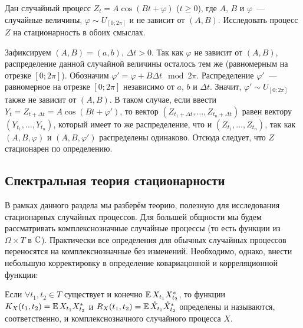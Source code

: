 \begin{exercise}
    \label{exercise:stationarity:cosine}
    Дан случайный процесс $ Z_t = A \cos (B t + \varphi) $ ($ t \geqslant 0 $),
    где $ A $, $ B $ и $ \varphi $~--- случайные величины,
    $ \varphi \sim U_{[0; 2\pi]} $ и не зависит от $ (A, B) $.
    Исследовать процесс $ Z $ на стационарность в обоих смыслах.
\end{exercise}

\begin{solution}
    Зафиксируем $ (A, B) = (a, b) $, $ \Delta t > 0 $.
    Так как $ \varphi $ не зависит от $ (A, B) $,
    распределение данной случайной величины осталось тем же (равномерным на отрезке $ [0; 2\pi] $).
    Обозначим $ \varphi' = \varphi + B \Delta t \mod 2 \pi $.
    Распределение $ \varphi' $~--- равномерное на отрезке $ [0; 2\pi] $ независимо от $ a $, $ b $ и $ \Delta t $.
    Значит, $ \varphi' \sim U_{[0;2\pi]} $ также не зависит от $ (A,B) $.
    В таком случае, если ввести $ Y_t = Z_{t + \Delta t} = A \cos (B t + \varphi') $,
    то вектор $ (Z_{t_1 + \Delta t}, \ldots, Z_{t_n + \Delta t}) $ равен вектору $ (Y_{t_1}, \ldots, Y_{t_n}) $,
    который имеет то же распределение, что и $ (Z_{t_1}, \ldots, Z_{t_n}) $,
    так как $ (A, B, \varphi) $ и $ (A, B, \varphi') $ распределены одинаково.
    Отсюда следует, что $ Z $ стационарен по определению.
\end{solution}


\subsection{Спектральная теория стационарности} \label{subsection:stationarity:spectral_theory}

В рамках данного раздела мы разберём теорию,
полезную для исследования стационарных случайных процессов.
Для большей общности мы будем рассматривать комплекснозначные случайные процессы
(то есть функции из $ \Omega \times T $ в $ \mathbb{C} $).
Практически все определения для обычных случайных процессов переносятся на комплекснозначные без изменений.
Необходимо, однако, внести небольшую корректировку в определение ковариацонной и корреляционной функции:

\begin{definition}
    \label{definition:stationarity:second_order_moment_functions_compex}
    Если $ \forall t_1, t_2 \in T $ существует и конечно $ \operatorname{\mathbb{E}} X_{t_1} X_{t_2}^* $,
    то функции $ K_X(t_1, t_2) = \operatorname{\mathbb{E}} X_{t_1} X_{t_2}^* $ и $ R_X(t_1, t_2) = \operatorname{\mathbb{E}} \mathring{X}_{t_1} \mathring{X}_{t_2}^* $
    определены и называются, соответственно,  и 
    комплекснозначного случайного процесса $ X $.
\end{definition}

